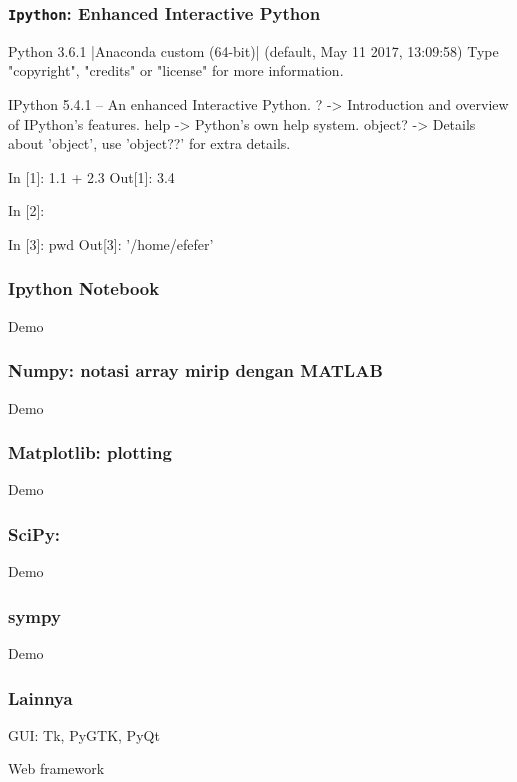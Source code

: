 \documentclass[bahasa,10pt]{beamer}
\begin{document}
\begin{frame}[fragile]
\frametitle{\texttt{Ipython}: Enhanced Interactive Python}

\begin{textcode}
Python 3.6.1 |Anaconda custom (64-bit)| (default, May 11 2017, 13:09:58) 
Type "copyright", "credits" or "license" for more information.

IPython 5.4.1 -- An enhanced Interactive Python.
?         -> Introduction and overview of IPython's features.
help      -> Python's own help system.
object?   -> Details about 'object', use 'object??' for extra details.

In [1]: 1.1 + 2.3
Out[1]: 3.4

In [2]: %

In [3]: pwd
Out[3]: '/home/efefer'
\end{textcode}

\end{frame}

\begin{frame}
\frametitle{Ipython Notebook}

Demo

\end{frame}


\begin{frame}[fragile]
\frametitle{Numpy: notasi array mirip dengan MATLAB}

Demo

\end{frame}


\begin{frame}[fragile]
\frametitle{Matplotlib: plotting}
  
Demo
  
\end{frame}

\begin{frame}[fragile]
\frametitle{SciPy:}

Demo

\end{frame}


\begin{frame}[fragile]
\frametitle{sympy}
  
Demo
  
\end{frame}


\begin{frame}[fragile]
\frametitle{Lainnya}
    
GUI: Tk, PyGTK, PyQt

Web framework

\end{frame}
\end{document}
